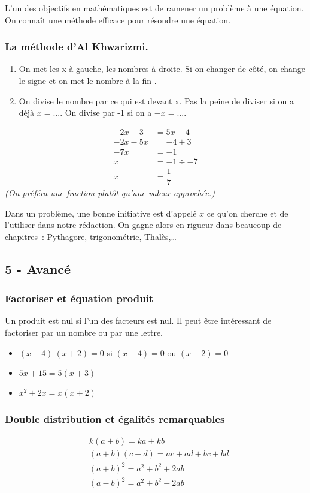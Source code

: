 \documentclass[11pt]{article}
\begin{document}
L’un des objectifs en mathématiques est de ramener un problème à une équation. On connaît une méthode efficace pour résoudre une équation.
\begin{multicols}{2}
  \subsubsection*{La méthode d’Al Khwarizmi.}
  \begin{enumerate}
  \item On met les x à gauche, les nombres à droite. Si on changer de côté, on change le signe et on met le nombre \og à la fin \fg.
  \item On divise le nombre par ce qui est devant x. Pas la peine de diviser si on a déjà $x= ...$. On divise par -1 si on a $-x = ...$.
  \end{enumerate}

  \begin{align*}
    -2x - 3 &= 5x - 4 \\
    -2x -5x &= -4 + 3 \\
    -7x &= -1  \\
    x &= -1 \div -7 \\
    x &= \dfrac{1}{7}
  \end{align*}
  \textit{(On préféra une fraction plutôt qu'une valeur approchée.)}
\end{multicols}

Dans un problème, une bonne initiative est d’appelé $x$ ce qu’on cherche et de l’utiliser dans notre rédaction. On gagne alors en rigueur dans beaucoup de chapitres : Pythagore, trigonométrie, Thalès,…

\subsection*{5 - Avancé}

\subsubsection*{Factoriser et équation produit}

Un produit est nul si l’un des facteurs est nul. Il peut être intéressant de factoriser par un nombre ou par une lettre.

\begin{itemize}
\item $(x-4) ~ (x + 2) = 0 $ si  $(x-4) = 0 $ ou $(x + 2) = 0 $
\item $5x + 15 = 5(x + 3)$
\item $x^2 + 2x = x(x + 2)$ 
\end{itemize} 

\subsubsection*{Double distribution et égalités remarquables}
  \begin{align*}
  &k (a + b) = ka + kb \\
  &(a + b)(c + d) = ac + ad + bc + bd \\
  &(a + b)^2 = a^2 + b^2 + 2 ab \\
  &(a - b)^2 = a^2 + b^2 - 2 ab 
  \end{align*}
\end{document}
